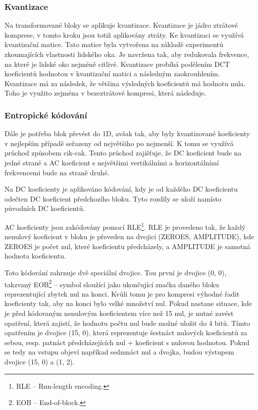 \subsubsection*{Kvantizace}

Na transformované bloky se aplikuje kvantizace.
Kvantizace je jádro ztrátové komprese, v tomto kroku jsou totiž aplikovány ztráty.
Ke kvantizaci se využívá kvantizační matice.
Tato matice byla vytvořena na základě experimentů zkoumajících vlastnosti lidského oka.
Je navržena tak, aby redukovala frekvence, na které je lidské oko nejméně citlivé.
Kvantizace probíhá podělením DCT koeficientů hodnotou v kvantizační matici a následným zaokrouhlením.
Kvantizace má za následek, že většina výsledných koeficientů má hodnotu nula.
Toho je využito zejména v bezeztrátové kompresi, která následuje.

\subsubsection*{Entropické kódování}

Dále je potřeba blok převést do 1D, avšak tak, aby byly kvantizované koeficienty v nejlepším případě seřazeny od největšiho po nejmenší.
K tomu se využívá průchod způsobem cik-cak.
Tento průchod zajišťuje, že DC koeficient bude na jedné straně a AC koeficient s největšimi vertikálními a horizontálnímí frekvencemi bude na straně druhé.

Na DC koeficienty je aplikováno kódování, kdy je od každého DC koeficientu odečten DC koeficient předchozího bloku.
Tyto rozdíly se uloží namísto původních DC koeficientů.

AC koeficienty jsou zakódovány pomocí RLE\footnote{RLE -- Run-length encoding.}.
RLE je provedeno tak, že každý nenulový koeficient v bloku je převeden na dvojici (ZEROES, AMPLITUDE), kde ZEROES je počet nul, které koeficientu předcházely, a AMPLITUDE je samotná hodnota koeficientu.

Toto kódování zahrnuje dvě speciální dvojice.
Tou první je dvojice (0, 0), takzvaný EOB\footnote{EOB -- End-of-block.} -- symbol sloužící jako ukončující značka daného bloku reprezentující zbytek nul na konci.
Kvůli tomu je pro kompresi výhodné řadit koeficienty tak, aby na konci bylo velké množství nul.
Pokud nastane situace, kde je před kódovaným nenulovým koeficientem více než 15 nul, je nutné zavést opatření, která zajistí, že hodnotu počtu nul bude možné uložit do 4 bitů.
Tímto opatřením je dvojice (15, 0), která reprezentuje šestnáct nulových koeficientů za sebou, resp. patnáct předcházejících nul + koeficient s nulovou hodnotou.
Pokud se tedy na vstupu objeví napříkad sedmnáct nul a dvojka, budou výstupem dvojice (15, 0) a (1, 2).

